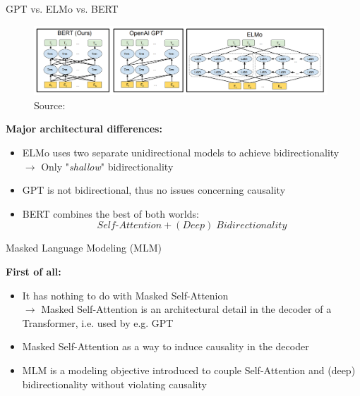 \documentclass[]{beamer}
\begin{document}
\begin{frame}{GPT vs. ELMo vs. BERT}

\begin{figure}
\centering
\includegraphics[width = 11cm]{figure/comparison-bert.png}\\ 
\footnotesize{Source:} \href{https://arxiv.org/pdf/1810.04805.pdf}{}
\end{figure}

\textbf{Major architectural differences:}

\begin{itemize}
\item ELMo uses two separate unidirectional models to achieve bidirectionality\\
  $\rightarrow$ Only "\textit{shallow}" bidirectionality
\item GPT is not bidirectional, thus no issues concerning causality
\item BERT combines the best of both worlds: $$Self\text{-}Attention + (Deep)\;Bidirectionality$$
\end{itemize} 
\end{frame}



\begin{frame}{Masked Language Modeling (MLM)}

\textbf{First of all:}

\begin{itemize}
\item It has nothing to do with Masked Self-Attenion\\ 
  $\rightarrow$ Masked Self-Attention is an architectural detail in the decoder of a Transformer, i.e. used by e.g. GPT
\item Masked Self-Attention as a way to induce causality in the decoder
\item MLM is a modeling objective introduced to couple Self-Attention and (deep) bidirectionality without violating causality
\end{itemize}
\end{frame}
\end{document}
